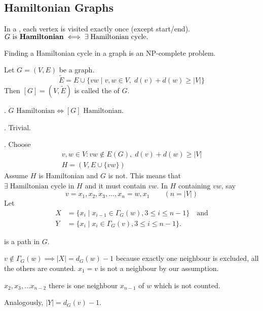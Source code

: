 
\subsection{Hamiltonian Graphs}

\begin{definition}
In a , each vertex is visited exactly once (except start/end).
$\text{$G$ is \textbf{Hamiltonian}} \iff \exists\;\text{Hamiltonian cycle}.$
\end{definition}

Finding a Hamiltonian cycle in a graph is an NP-complete problem.

\begin{definition}
Let $G=(V,E)$ be a graph.
\[
\tilde E = E\cup \{vw \mid v,w\in V,\; d(v)+d(w) ≥ |V|\}
\]
Then $[G] = (V,\tilde E)$ is called the  of $G$.
\end{definition}

\Theorem.  $G\text{ Hamiltonian} \iff [G]\text{ Hamiltonian}.$

\ProofForward.
Trivial.

\ProofBackward.
Choose
\begin{gather*}
  v,w\in V: vw \not\in E(G),\;d(v)+d(w) ≥ |V| \\
  H=(V,E\cup \{vw\})
\end{gather*}
Assume $H$ is Hamiltonian and $G$ is not.
This means that $\exists\;\text{Hamiltonian cycle in $H$}$ and it must contain $vw$.
In $H$ containing $vw$, say
\[ v=x_1,x_2,x_3,\ldots,x_n=w,x_1 \qquad(n=|V|)\]
Let
\begin{align*}
    X &=\{x_i \mid x_{i-1}\in \Gamma_G(w), 3 ≤ i ≤ n-1 \}\quad\text{and} \\
    Y &=\{x_i \mid x_i\in \Gamma_G(v), 3 ≤ i ≤ n-1 \}.
\end{align*}

 is a path in $G$.

$v \not\in \Gamma_G(w) \implies |X| = d_G(w) - 1$
because exactly one neighbour is excluded, all the others are counted. $x_1= v$ is not a neighbour by our assumption.

$x_2, x_3, \ldots x_{n-2}$ there is one neighbour $x_{n-1}$ of $w$ which is not counted. 

Analogously,
$|Y| = d_G(v) - 1$.

